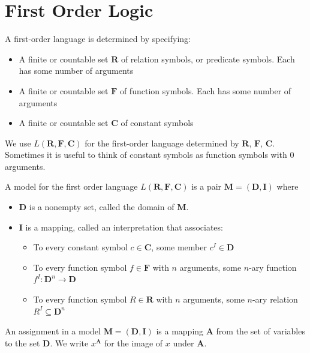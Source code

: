 \documentclass[a4paper]{article}
\theoremstyle{plain}
\theoremstyle{definition}
\newtheorem{defn}{Definition}[section]
\theoremstyle{remark}
\begin{document}
\section{First Order Logic}
\begin{tcolorbox}[colback=black!3!white,colframe=black!60!white,title=\begin{defn}First-Order Language \label{First-Order Language}\end{defn}]
A first-order language is determined by specifying:
\begin{itemize}
	\item A finite or countable set $\mathbf{R}$ of relation symbols, or predicate symbols. Each has some number of arguments
	\item A finite or countable set $\mathbf{F}$ of function symbols. Each has some number of arguments
	\item A finite or countable set $\mathbf{C}$ of constant symbols
\end{itemize}
We use $L(\mathbf{R},\mathbf{F}, \mathbf{C})$ for the first-order language determined by $\mathbf{R}$, $\mathbf{F}$, $\mathbf{C}$. Sometimes it is useful to think of constant symbols as function symbols with $0$ arguments.
\end{tcolorbox}
\begin{tcolorbox}[colback=black!3!white,colframe=black!60!white,title=\begin{defn}Model \label{Model}\end{defn}]
A model for the first order language $L(\mathbf{R},\mathbf{F},\mathbf{C})$ is a pair $\mathbf{M}=(\mathbf{D},\mathbf{I})$ where
\begin{itemize}
	\item $\mathbf{D}$ is a nonempty set, called the domain of $\mathbf{M}$.
	\item $\mathbf{I}$ is a mapping, called an interpretation that associates:
		\begin{itemize}
			\item To every constant symbol $c \in \mathbf{C}$, some member $c^{I} \in \mathbf{D}$ 
			\item To every function symbol $f \in \mathbf{F}$ with $n$ arguments, some $n$-ary function $f^{I}: \mathbf{D}^{n}\to \mathbf{D}$ 
			\item To every function symbol $R \in \mathbf{R}$ with $n$ arguments, some $n$-ary relation $R^{I}\subseteq \mathbf{D}^{n}$
		\end{itemize}
\end{itemize}
An assignment in a model $\mathbf{M} = (\mathbf{D},\mathbf{I})$ is a mapping $\mathbf{A}$ from the set of variables to the set $\mathbf{D}$. We write $x^{\mathbf{A}}$ for the image of $x$ under $\mathbf{A}$.
\end{tcolorbox}
\end{document}

